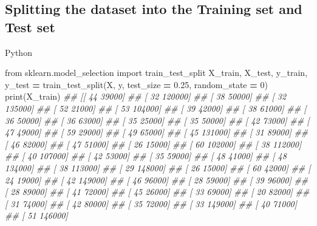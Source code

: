 \documentclass[
]{book}
\newenvironment{Shaded}{\begin{snugshade}}{\end{snugshade}}
\newcommand{\BuiltInTok}[1]{#1}
\newcommand{\CommentTok}[1]{\textcolor[rgb]{0.56,0.35,0.01}{\textit{#1}}}
\newcommand{\DecValTok}[1]{\textcolor[rgb]{0.00,0.00,0.81}{#1}}
\newcommand{\FloatTok}[1]{\textcolor[rgb]{0.00,0.00,0.81}{#1}}
\newcommand{\ImportTok}[1]{#1}
\newcommand{\NormalTok}[1]{#1}
\newcommand{\OperatorTok}[1]{\textcolor[rgb]{0.81,0.36,0.00}{\textbf{#1}}}
\theoremstyle{definition}
\theoremstyle{definition}
\theoremstyle{definition}
\theoremstyle{definition}
\theoremstyle{remark}
\begin{document}
\hypertarget{splitting-the-dataset-into-the-training-set-and-test-set-3}{%
\subsection{Splitting the dataset into the Training set and Test set}\label{splitting-the-dataset-into-the-training-set-and-test-set-3}}

Python

\begin{Shaded}
\begin{Highlighting}[]
\ImportTok{from}\NormalTok{ sklearn.model\_selection }\ImportTok{import}\NormalTok{ train\_test\_split}
\NormalTok{X\_train, X\_test, y\_train, y\_test }\OperatorTok{=}\NormalTok{ train\_test\_split(X, y, test\_size }\OperatorTok{=} \FloatTok{0.25}\NormalTok{, random\_state }\OperatorTok{=} \DecValTok{0}\NormalTok{)}
\BuiltInTok{print}\NormalTok{(X\_train)}
\CommentTok{\#\# [[    44  39000]}
\CommentTok{\#\#  [    32 120000]}
\CommentTok{\#\#  [    38  50000]}
\CommentTok{\#\#  [    32 135000]}
\CommentTok{\#\#  [    52  21000]}
\CommentTok{\#\#  [    53 104000]}
\CommentTok{\#\#  [    39  42000]}
\CommentTok{\#\#  [    38  61000]}
\CommentTok{\#\#  [    36  50000]}
\CommentTok{\#\#  [    36  63000]}
\CommentTok{\#\#  [    35  25000]}
\CommentTok{\#\#  [    35  50000]}
\CommentTok{\#\#  [    42  73000]}
\CommentTok{\#\#  [    47  49000]}
\CommentTok{\#\#  [    59  29000]}
\CommentTok{\#\#  [    49  65000]}
\CommentTok{\#\#  [    45 131000]}
\CommentTok{\#\#  [    31  89000]}
\CommentTok{\#\#  [    46  82000]}
\CommentTok{\#\#  [    47  51000]}
\CommentTok{\#\#  [    26  15000]}
\CommentTok{\#\#  [    60 102000]}
\CommentTok{\#\#  [    38 112000]}
\CommentTok{\#\#  [    40 107000]}
\CommentTok{\#\#  [    42  53000]}
\CommentTok{\#\#  [    35  59000]}
\CommentTok{\#\#  [    48  41000]}
\CommentTok{\#\#  [    48 134000]}
\CommentTok{\#\#  [    38 113000]}
\CommentTok{\#\#  [    29 148000]}
\CommentTok{\#\#  [    26  15000]}
\CommentTok{\#\#  [    60  42000]}
\CommentTok{\#\#  [    24  19000]}
\CommentTok{\#\#  [    42 149000]}
\CommentTok{\#\#  [    46  96000]}
\CommentTok{\#\#  [    28  59000]}
\CommentTok{\#\#  [    39  96000]}
\CommentTok{\#\#  [    28  89000]}
\CommentTok{\#\#  [    41  72000]}
\CommentTok{\#\#  [    45  26000]}
\CommentTok{\#\#  [    33  69000]}
\CommentTok{\#\#  [    20  82000]}
\CommentTok{\#\#  [    31  74000]}
\CommentTok{\#\#  [    42  80000]}
\CommentTok{\#\#  [    35  72000]}
\CommentTok{\#\#  [    33 149000]}
\CommentTok{\#\#  [    40  71000]}
\CommentTok{\#\#  [    51 146000]}

\end{Highlighting}
\end{Shaded}
\end{document}
